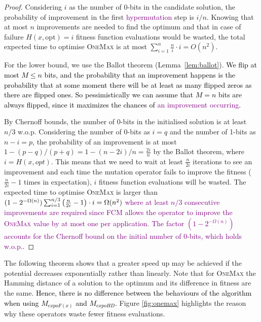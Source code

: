 \documentclass[lettersize,journal]{IEEEtran}
\newcommand{\new}[1]{\textcolor{black}{#1}}
\newcommand{\rerev}[1]{\textcolor{purple}{#1}}
\begin{document}
\begin{proof}
Considering $i$ as the number of 0-bits in the candidate solution, the probability of improvement in the first \rerev{hypermutation} step is $i/n$. Knowing that at most $n$ improvements are needed to find the optimum and that in case of failure $H(x,\text{opt})=i$ fitness function evaluations would be wasted, the total expected time to optimise \textsc{OneMax} is at most $\sum_{i=1}^n \frac{n}{i} \cdot i =O(n^2)$.

For the lower bound, we use the Ballot theorem (Lemma~\ref{lem:ballot}). 
\new{We flip at most $M \le n$ bits, and the probability that an improvement happens is the probability that at some moment there will be at least as many flipped zeros as there are flipped ones. So pessimistically we can assume that  $M = n$ bits are always flipped, since it maximizes the chances of \rerev{an improvement occurring}.} 

By Chernoff bounds, the number of 0-bits in the initialised solution is at least $n/3$ w.o.p. Considering the number of 
0-bits as $i=q$ and the number of 1-bits as $n-i=p$, the probability of 
an improvement is at most $1-(p-q)/(p+q)=1-(n-2i)/n=\frac{2i}{n}$ by the Ballot theorem, where $i=H(x, opt)$. This means that we need to wait at least $\frac{n}{2i}$ iterations to see an improvement and each time the mutation operator fails to improve the fitness {(\color{black}$\frac{n}{2i} - 1$ times in expectation)}, $i$ fitness function evaluations will be wasted. The expected time to optimise \textsc{OneMax} is larger than \textcolor{black}{$(1-2^{-\Omega(n)})\sum_{i=1}^{n/3} {\color{black}\left(\frac{n}{2i}-1\right)} \cdot i = \Omega(n^2)$} \rerev{where at least $n/3$ consecutive improvements are required since FCM allows the operator to improve the \textsc{OneMax} value by at most one per application. The factor $(1-2^{-\Omega(n)})$ accounts for the Chernoff bound on the initial number of $0$-bits, which holds w.o.p.}.
\end{proof}

The following theorem shows that a greater speed up may be achieved if the potential decreases exponentially rather than linearly. Note that for \textsc{OneMax} the Hamming distance of a solution to the optimum and its difference in fitness are the same. \new{Hence, there is no difference between the behaviours of the algorithm when using $M_{expoF(x)}$ and $M_{expoHD}$.} 
Figure \ref{fig:onemax} highlights the reason why these operators waste fewer fitness evaluations.
\end{document}
